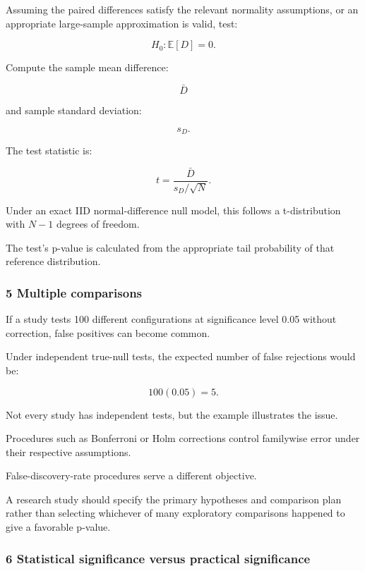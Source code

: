 Assuming the paired differences satisfy the relevant normality assumptions, or an appropriate large-sample approximation is valid, test:

\[
 H_0:\mathbb E[D]=0.
\]

Compute the sample mean difference:

\[
 \bar D
\]

and sample standard deviation:

\[
 s_D.
\]

The test statistic is:

\[
 \boxed{ t= \frac{\bar D}{s_D/\sqrt N} }.
\]

Under an exact IID normal-difference null model, this follows a t-distribution with \(N-1\) degrees of freedom.

The test's p-value is calculated from the appropriate tail probability of that reference distribution.

\subsubsection{5 Multiple comparisons}\label{02-foundations-ii-ch030-multiple-comparisons}

\hypertarget{02-foundations-ii-ch030-multiple-comparisons}{}

If a study tests 100 different configurations at significance level 0.05 without correction, false positives can become common.

Under independent true-null tests, the expected number of false rejections would be:

\[
 100(0.05)=5.
\]

Not every study has independent tests, but the example illustrates the issue.

Procedures such as Bonferroni or Holm corrections control familywise error under their respective assumptions.

False-discovery-rate procedures serve a different objective.

A research study should specify the primary hypotheses and comparison plan rather than selecting whichever of many exploratory comparisons happened to give a favorable p-value.

\subsubsection{6 Statistical significance versus practical significance}\label{02-foundations-ii-ch030-statistical-significance-versus-practical-significance}

